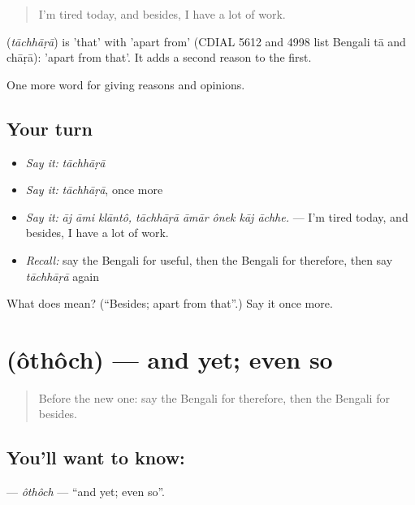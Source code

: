 \begin{quote}
I'm tired today, and besides, I have a lot of work.
\end{quote}

\begin{cousinweb}
\textbf{} (\emph{tāchhāṛā}) is  'that' with  'apart from' (CDIAL 5612 and 4998 list Bengali tā and chāṛā): 'apart from that'. It adds a second reason to the first.
\end{cousinweb}

\begin{grammarlens}[title={What you've built}]
One more word for giving reasons and opinions.
\end{grammarlens}

\subsection*{Your turn}
\begin{itemize}
\raggedright
  \item \emph{Say it:} \emph{tāchhāṛā}
  \item \emph{Say it:} \emph{tāchhāṛā}, once more
  \item \emph{Say it:} \emph{āj āmi klāntô, tāchhāṛā āmār ônek kāj āchhe.} — I'm tired today, and besides, I have a lot of work.
  \item \emph{Recall:} say the Bengali for useful, then the Bengali for therefore, then say \emph{tāchhāṛā} again
\end{itemize}

\begin{tcolorbox}[breakable,colback=teal!4,colframe=teal!35!black,title={Before you move on}]
What does  mean? (\textquotedblleft{}Besides; apart from that\textquotedblright{}.) Say it once more.
\end{tcolorbox}
\section[\texorpdfstring{\bn{অথচ} (ôthôch)}{অথচ (ôthôch)}]{ (ôthôch) — and yet; even so}

\label{lesson:BN-C332-othoch}



\begin{quote}
Before the new one: say the Bengali for therefore, then the Bengali for besides.
\end{quote}

\subsection*{You'll want to know: }
\textbf{} — \emph{ôthôch} — \textquotedblleft{}and yet; even so\textquotedblright{}.

